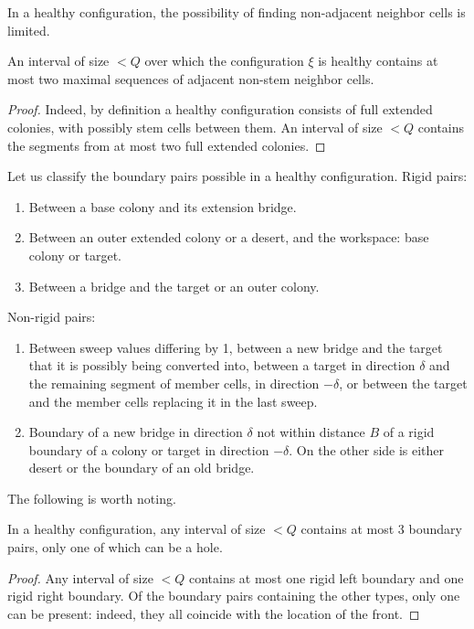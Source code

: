 \documentclass[12pt]{memoir}
\def\B{B}
\begin{document}
In a healthy configuration, the possibility of finding non-adjacent neighbor
cells is limited.

\begin{lemma}\label{lem:two-domains}
  An interval of size \( <Q \) over which the configuration \( \xi \) is healthy
contains at most two maximal sequences of adjacent non-stem neighbor cells.
\end{lemma}
\begin{proof}
Indeed, by definition a healthy configuration consists of full extended colonies, with 
possibly stem cells between them.
An interval of size \( <Q \) contains the segments from at most two full extended colonies.
\end{proof}

Let us classify the boundary pairs possible in a healthy configuration.
Rigid pairs:

\begin{enumerate}[(r1)]
\item\label{i:rigid.base-bridge} Between a base colony and its extension bridge.
\item\label{i:rigid.outer-workspace}
Between an outer extended colony or a desert, and the workspace: base colony or target.
\item\label{i:rigid.bridge-target} Between a bridge and the target or an outer colony.
\end{enumerate}

Non-rigid pairs:

\begin{enumerate}[(nr1)]
  \item\label{i:nonrigid.sweep} Between sweep values differing by 1,
between a new bridge and the target that it is possibly being converted into,
between a target in direction \( \delta \) and 
the remaining segment of member cells, in direction \( -\delta \),
or between the target and the member cells replacing it in the last sweep.

  \item\label{i:nonrigid.bridge-bridge} Boundary of a new bridge in direction \( \delta \)
not within distance \( \B \) of a rigid boundary of a colony or target in direction \( -\delta \).
On the other side is either desert or the boundary of an old bridge.

\end{enumerate}

The following is worth noting.

\begin{lemma}
In a healthy configuration, any interval of size \( <Q \) contains at most 3 boundary pairs,
only one of which can be  a hole.
\end{lemma}
\begin{proof}
Any interval of size \( <Q \) contains at most one rigid left boundary and
one rigid right boundary.
Of the boundary pairs containing the other
types, only one can be present: indeed, they all coincide with the location of the front.
\end{proof}
\end{document}
